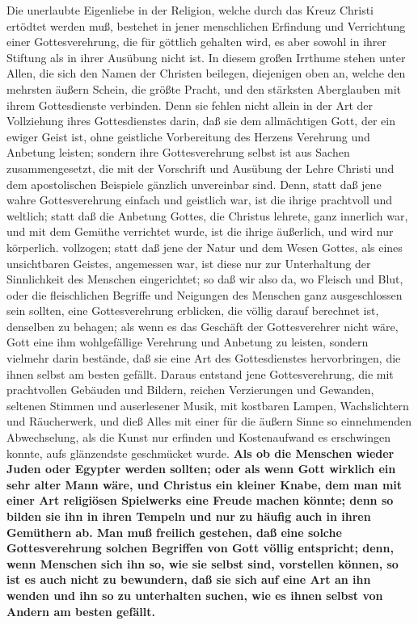 Die unerlaubte Eigenliebe in der Religion, welche durch das Kreuz Christi
ertödtet werden muß, bestehet in jener menschlichen Erfindung und Verrichtung
einer Gottesverehrung, die für göttlich gehalten wird, es aber sowohl in ihrer
Stiftung als in ihrer Ausübung nicht ist. In diesem großen Irrthume stehen unter
Allen, die sich den Namen der Christen beilegen, diejenigen oben an, welche den
mehrsten äußern Schein, die größte Pracht, und den stärksten Aberglauben mit
ihrem Gottesdienste verbinden. Denn sie fehlen nicht allein in der Art der
Vollziehung ihres Gottesdienstes darin, daß sie dem allmächtigen Gott, der ein
ewiger Geist ist, ohne geistliche Vorbereitung 
des Herzens Verehrung und
Anbetung leisten; sondern ihre Gottesverehrung selbst ist aus Sachen
zusammengesetzt, die mit der Vorschrift und Ausübung der Lehre Christi und dem
apostolischen Beispiele gänzlich unvereinbar sind. Denn, statt daß jene wahre
Gottesverehrung einfach und geistlich war, ist die ihrige prachtvoll und
weltlich; statt daß die Anbetung Gottes, die Christus lehrete, ganz innerlich
war, und mit dem Gemüthe verrichtet wurde, ist die ihrige äußerlich, und wird
nur körperlich. vollzogen; statt daß jene der Natur und dem Wesen Gottes, als
eines unsichtbaren Geistes, angemessen war, ist diese nur zur Unterhaltung der
Sinnlichkeit des Menschen eingerichtet; so daß wir also da, wo Fleisch und Blut,
oder die fleischlichen Begriffe und Neigungen des Menschen ganz ausgeschlossen
sein sollten, eine Gottesverehrung erblicken, die völlig darauf berechnet ist,
denselben zu behagen; als wenn es das Geschäft der Gottesverehrer nicht wäre,
Gott eine ihm wohlgefällige Verehrung und Anbetung zu leisten, sondern vielmehr
darin bestände, daß sie eine Art des Gottesdienstes hervorbringen, die ihnen
selbst am besten gefällt. Daraus entstand jene Gottesverehrung, die mit
prachtvollen Gebäuden und Bildern, reichen Verzierungen und Gewanden, seltenen
Stimmen und auserlesener Musik, mit kostbaren Lampen,
Wachslichtern und
Räucherwerk, und dieß Alles mit einer für die äußern Sinne so
einnehmenden
Abwechselung, als die Kunst nur erfinden und Kostenaufwand es erschwingen
konnte, aufs glänzendste geschmücket wurde. \textbf{Als ob die Menschen wieder
Juden
oder Egypter  werden sollten;
oder als wenn Gott  wirklich ein sehr alter Mann
wäre, und Christus ein kleiner Knabe, dem man mit einer Art religiösen
Spielwerks eine Freude machen könnte; denn so bilden sie ihn in ihren Tempeln
und nur zu häufig auch in ihren Gemüthern ab. Man muß freilich gestehen, daß
eine solche Gottesverehrung solchen Begriffen von Gott völlig entspricht; denn,
wenn Menschen sich ihn so, wie sie selbst sind, vorstellen können, so ist es
auch nicht zu  bewundern, daß sie sich auf eine Art an ihn wenden und ihn so zu
unterhalten suchen, wie es ihnen selbst von Andern am besten gefällt.}

